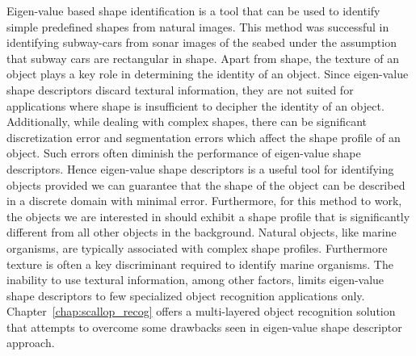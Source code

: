 Eigen-value based shape identification is a tool that can be used to identify simple predefined shapes from natural images. This method was successful in identifying subway-cars from sonar images of the seabed under the assumption that subway cars are rectangular in shape. Apart from shape, the texture of an object plays a key role in determining the identity of an object. Since eigen-value shape descriptors discard textural information, they are not suited for applications where shape is insufficient to decipher the identity of an object. Additionally, while dealing with complex shapes, there can be significant discretization error and segmentation errors which affect the shape profile of an object. Such errors often diminish the performance of eigen-value shape descriptors. Hence eigen-value shape descriptors is a useful tool for identifying objects provided we can guarantee that the shape of the object can be described in a discrete domain with minimal error. Furthermore, for this method to work, the 
objects we are interested in should exhibit a shape profile that is significantly different from all other objects in the background. Natural objects, like marine organisms, are typically associated with complex shape profiles. Furthermore texture is often a key discriminant required to identify marine organisms. The inability to use textural information, among other factors, limits eigen-value shape descriptors to few specialized object recognition applications only. Chapter~\ref{chap:scallop_recog} offers a multi-layered object recognition solution that attempts to overcome some drawbacks seen in eigen-value shape descriptor approach.

